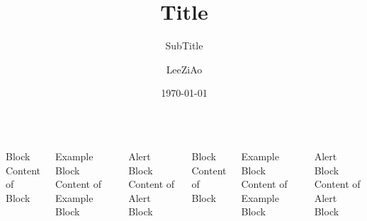\documentclass{beamer}
\author[lza]{LeeZiAo}
\title[title]{Title}
\subtitle{SubTitle}
\institute{HuaZhong University of Science and Technology}
\date{\today}
\begin{document}
\maketitle

\begin{frame}
	\begin{columns}
	\begin{block}{Block}
		Content of Block
	\end{block}
	\begin{exampleblock}{Example Block}
		Content of Example Block
	\end{exampleblock}
	\begin{alertblock}{Alert Block}
		Content of Alert Block
	\end{alertblock}
	\begin{block}{Block}
		Content of Block
	\end{block}
	\begin{exampleblock}{Example Block}
		Content of Example Block
	\end{exampleblock}
	\begin{alertblock}{Alert Block}
		Content of Alert Block
	\end{alertblock}
	\end{columns}
\end{frame}
\end{document}
